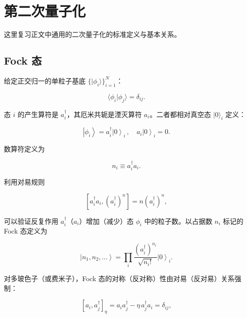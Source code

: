 \chapter{第二次量子化}

这里复习正文中通用的二次量子化的标准定义与基本关系。

\section{Fock 态}

给定正交归一的单粒子基底 $\{|\phi_{i}\rangle\}_{i=1}^{N}$：

\begin{equation*}
\langle \phi_ {i} | \phi_ {j} \rangle = \delta_ {ij}.
\tag{A.1}
\end{equation*}

态 $i$ 的产生算符是 $a_{i}^{\dagger}$，其厄米共轭是湮灭算符 $a_{i}$。二者都相对真空态 $|0\rangle_{i}$ 定义：

\begin{equation*}
\left| \phi_ {i} \right\rangle = a _ {i} ^ {\dagger} \left| 0 \right\rangle_{i} \, , \quad a _ {i} \left| 0 \right\rangle_{i} = 0.
\tag{A.2}
\end{equation*}

数算符定义为

\begin{equation*}
n _ {i} \equiv a _ {i} ^ {\dagger} a _ {i}.
\tag{A.3}
\end{equation*}

利用对易规则

\begin{equation*}
\left[ a _ {i} ^ {\dagger} a _ {i}, \left( a _ {i} ^ {\dagger} \right) ^ {n} \right] = n \left( a _ {i} ^ {\dagger} \right) ^ {n} ,
\tag{A.4}
\end{equation*}

可以验证反复作用 $a_{i}^{\dagger}$（$a_{i}$）增加（减少）态 $\phi_{i}$ 中的粒子数。以占据数 $n_{i}$ 标记的 Fock 态定义为

\begin{equation*}
\left| n _ {1}, n _ {2}, \dots \right\rangle = \prod_ {i} \frac {\left( a _ {i} ^ {\dagger} \right) ^ {n _ {i}}}{\sqrt {n _ {i} !}} \left| 0 \right\rangle_{i}.
\tag{A.5}
\end{equation*}

对多玻色子（或费米子），Fock 态的对称（反对称）性由对易（反对易）关系强制：

\begin{equation*}
\left[ a _ {i}, a _ {j} ^ {\dagger} \right]_{\eta} = a _ {i} a _ {j} ^ {\dagger} - \eta \, a _ {j} ^ {\dagger} a _ {i} = \delta_{ij} ,
\tag{A.6}
\end{equation*}

